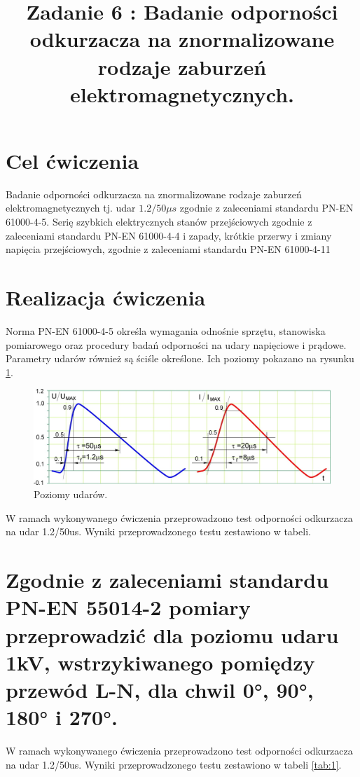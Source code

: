 \documentclass{classrep}
\author{
  \studentinfo{Witold Olechowski}{127517} \and
  \studentinfo{Grzegorz Pelczar}{125242} \and
  \studentinfo{Mateusz Kut}{125212} \and
  \studentinfo{Tomasz Marecik}{127374} 
}
\title{Zadanie 6 : Badanie  odporności odkurzacza na znormalizowane rodzaje zaburzeń elektromagnetycznych. }
\begin{document}
\maketitle

\section{Cel ćwiczenia}

Badanie  odporności odkurzacza na znormalizowane rodzaje zaburzeń elektromagnetycznych tj. udar $1.2/50 \mu s$ zgodnie z zaleceniami standardu PN-EN 61000-4-5. Serię szybkich elektrycznych stanów przejściowych zgodnie z zaleceniami standardu PN-EN 61000-4-4 i zapady, krótkie przerwy i zmiany napięcia przejściowych, zgodnie z zaleceniami standardu PN-EN 61000-4-11

\section{Realizacja ćwiczenia}
Norma PN-EN 61000-4-5 określa wymagania odnośnie sprzętu, stanowiska pomiarowego oraz procedury badań odporności na udary napięciowe i prądowe. Parametry udarów również są ściśle określone. Ich poziomy pokazano na rysunku \ref{fig:wyk1}.

\begin{figure}[H]
\centering
\includegraphics[width=0.7\linewidth]{wyk1}
\caption{Poziomy udarów.}
\label{fig:wyk1}
\end{figure}

W ramach wykonywanego ćwiczenia przeprowadzono test odporności odkurzacza na udar 1.2/50us. Wyniki przeprowadzonego testu zestawiono w tabeli.

\section{Zgodnie z zaleceniami standardu PN-EN 55014-2 pomiary przeprowadzić dla poziomu udaru 1kV, wstrzykiwanego pomiędzy przewód L-N, dla  chwil 0°, 90°, 180° i 270°.}

W ramach wykonywanego ćwiczenia przeprowadzono test odporności odkurzacza na udar 1.2/50us. Wyniki przeprowadzonego testu zestawiono w tabeli \ref{tab:1}.
\end{document}
